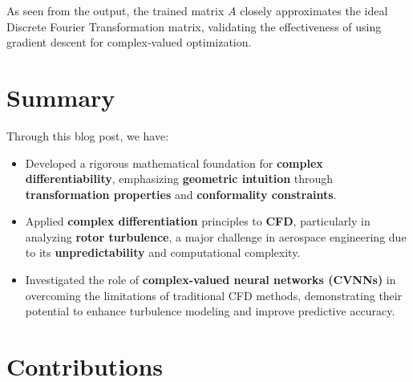 \documentclass[a4paper,10.5pt]{article}
\begin{document}
\begin{table}[h]
\centering
\renewcommand{\arraystretch}{1.2} %
\caption{Trained Matrix Representation}
\end{table}

As seen from the output, the trained matrix $A$ closely approximates the ideal Discrete Fourier Transformation matrix, validating the effectiveness of using gradient descent for complex-valued optimization.

\section{Summary}

Through this blog post, we have:

\begin{itemize}  
    \item Developed a rigorous mathematical foundation for \textbf{complex differentiability}, emphasizing \textbf{geometric intuition} through \textbf{transformation properties} and \textbf{conformality constraints}.  
    \item Applied \textbf{complex differentiation} principles to \textbf{CFD}, particularly in analyzing \textbf{rotor turbulence}, a major challenge in aerospace engineering due to its \textbf{unpredictability} and computational complexity.  
    \item Investigated the role of \textbf{complex-valued neural networks (CVNNs)} in overcoming the limitations of traditional CFD methods, demonstrating their potential to enhance turbulence modeling and improve predictive accuracy.  
\end{itemize}

\section{Contributions}
\end{document}
